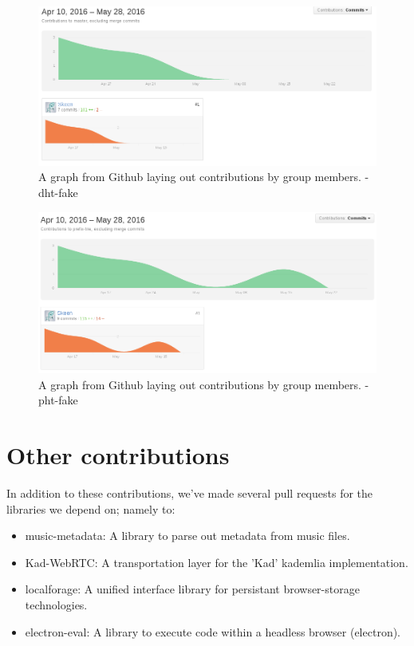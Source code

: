 \begin{figure}[H]
  \centering
    \includegraphics[width=\linewidth]{gfx/dht-fake}
    \caption{A graph from Github laying out contributions by group members. - dht-fake}
  \label{fig:music-stramer-library}
\end{figure}

\begin{figure}[H]
  \centering
    \includegraphics[width=\linewidth]{gfx/pht-fake}
    \caption{A graph from Github laying out contributions by group members. - pht-fake}
  \label{fig:music-stramer-library}
\end{figure}

\section{Other contributions}
In addition to these contributions, we've made several pull requests for the
libraries we depend on; namely to:
\begin{itemize}
\item music-metadata: A library to parse out metadata from music files.
\item Kad-WebRTC: A transportation layer for the 'Kad' kademlia implementation.
\item localforage: A unified interface library for persistant browser-storage
    technologies.
\item electron-eval: A library to execute code within a headless browser
    (electron).
\end{itemize}

